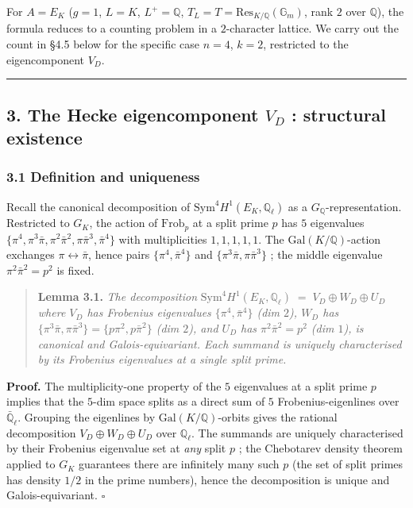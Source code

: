 \documentclass[
  11pt,
  a4paper,
]{amsart}
\begin{document}
For \(A = E_K\) (\(g = 1\), \(L = K\), \(L^+ = \mathbb{Q}\), \(T_L = T = \mathrm{Res}_{K/\mathbb{Q}}(\mathbb{G}_m)\), rank \(2\) over \(\mathbb{Q}\)), the formula reduces to a counting problem in a \(2\)-character lattice. We carry out the count in §4.5 below for the specific case \(n = 4\), \(k = 2\), restricted to the eigencomponent \(V_D\).

\begin{center}\rule{0.5\linewidth}{0.5pt}\end{center}

\hypertarget{the-hecke-eigencomponent-v_d-structural-existence}{%
\subsection{\texorpdfstring{3. The Hecke eigencomponent \(V_D\) : structural existence}{3. The Hecke eigencomponent V\_D : structural existence}}\label{the-hecke-eigencomponent-v_d-structural-existence}}

\hypertarget{definition-and-uniqueness}{%
\subsubsection{3.1 Definition and uniqueness}\label{definition-and-uniqueness}}

Recall the canonical decomposition of \(\mathrm{Sym}^4 H^1(E_K, \mathbb{Q}_\ell)\) as a \(G_\mathbb{Q}\)-representation. Restricted to \(G_K\), the action of \(\mathrm{Frob}_p\) at a split prime \(p\) has \(5\) eigenvalues \(\{\pi^4, \pi^3\bar\pi, \pi^2\bar\pi^2, \pi\bar\pi^3, \bar\pi^4\}\) with multiplicities \(1, 1, 1, 1, 1\). The \(\mathrm{Gal}(K/\mathbb{Q})\)-action exchanges \(\pi \leftrightarrow \bar\pi\), hence pairs \(\{\pi^4, \bar\pi^4\}\) and \(\{\pi^3\bar\pi, \pi\bar\pi^3\}\) ; the middle eigenvalue \(\pi^2\bar\pi^2 = p^2\) is fixed.

\begin{quote}
\textbf{Lemma 3.1.} \emph{The decomposition}
\(\mathrm{Sym}^4 H^1(E_K, \mathbb{Q}_\ell) \;=\; V_D \oplus W_D \oplus U_D\)
\emph{where \(V_D\) has Frobenius eigenvalues \(\{\pi^4, \bar\pi^4\}\) (dim \(2\)), \(W_D\) has \(\{\pi^3\bar\pi, \pi\bar\pi^3\} = \{p\pi^2, p\bar\pi^2\}\) (dim \(2\)), and \(U_D\) has \(\pi^2\bar\pi^2 = p^2\) (dim \(1\)), is canonical and Galois-equivariant. Each summand is uniquely characterised by its Frobenius eigenvalues at a single split prime.}
\end{quote}

\textbf{Proof.} The multiplicity-one property of the \(5\) eigenvalues at a split prime \(p\) implies that the \(5\)-dim space splits as a direct sum of \(5\) Frobenius-eigenlines over \(\bar{\mathbb{Q}}_\ell\). Grouping the eigenlines by \(\mathrm{Gal}(K/\mathbb{Q})\)-orbits gives the rational decomposition \(V_D \oplus W_D \oplus U_D\) over \(\mathbb{Q}_\ell\). The summands are uniquely characterised by their Frobenius eigenvalue set at \emph{any} split \(p\) ; the Chebotarev density theorem applied to \(G_K\) guarantees there are infinitely many such \(p\) (the set of split primes has density \(1/2\) in the prime numbers), hence the decomposition is unique and Galois-equivariant. \(\square\)
\end{document}
